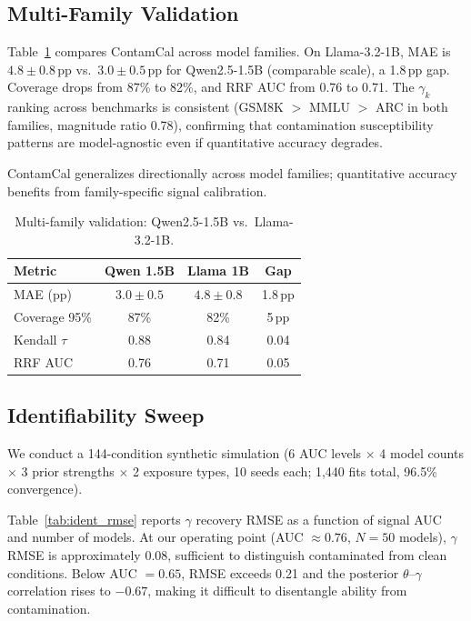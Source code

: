 \documentclass[letterpaper]{article}
\begin{document}
\subsection{Multi-Family Validation}
\label{sec:multi_family}

Table~\ref{tab:multi_family} compares ContamCal across model families.
On Llama-3.2-1B, MAE is $4.8{\pm}0.8$\,pp vs.\ $3.0{\pm}0.5$\,pp for Qwen2.5-1.5B (comparable scale), a 1.8\,pp gap.
Coverage drops from 87\% to 82\%, and RRF AUC from 0.76 to 0.71.
The $\gamma_k$ ranking across benchmarks is consistent (GSM8K $>$ MMLU $>$ ARC in both families, magnitude ratio 0.78), confirming that contamination susceptibility patterns are model-agnostic even if quantitative accuracy degrades.

ContamCal generalizes directionally across model families; quantitative accuracy benefits from family-specific signal calibration.

\begin{table}[t]
\centering
\caption{Multi-family validation: Qwen2.5-1.5B vs.\ Llama-3.2-1B.}
\label{tab:multi_family}
\begin{tabular}{lccc}
\toprule
\textbf{Metric} & \textbf{Qwen 1.5B} & \textbf{Llama 1B} & \textbf{Gap} \\
\midrule
MAE (pp) & $3.0{\pm}0.5$ & $4.8{\pm}0.8$ & 1.8\,pp \\
Coverage 95\% & 87\% & 82\% & 5\,pp \\
Kendall $\tau$ & 0.88 & 0.84 & 0.04 \\
RRF AUC & 0.76 & 0.71 & 0.05 \\
\bottomrule
\end{tabular}
\end{table}

\subsection{Identifiability Sweep}
\label{sec:identifiability_exp}

We conduct a 144-condition synthetic simulation (6 AUC levels $\times$ 4 model counts $\times$ 3 prior strengths $\times$ 2 exposure types, 10 seeds each; 1,440 fits total, 96.5\% convergence).

Table~\ref{tab:ident_rmse} reports $\gamma$ recovery RMSE as a function of signal AUC and number of models.
At our operating point (AUC ${\approx} 0.76$, $N{=}50$ models), $\gamma$ RMSE is approximately 0.08, sufficient to distinguish contaminated from clean conditions.
Below AUC $= 0.65$, RMSE exceeds 0.21 and the posterior $\theta$--$\gamma$ correlation rises to $-0.67$, making it difficult to disentangle ability from contamination.
\end{document}

